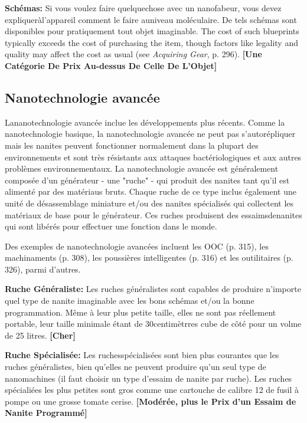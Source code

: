 \textbf{Schémas:} Si vous voulez faire quelquechose avec un nanofabeur, vous devez expliqueràl'appareil comment le faire auniveau moléculaire. De tels schémas sont disponibles pour pratiquement tout objet imaginable. The cost of such blueprints typically exceeds the cost of purchasing the item, though factors like legality and quality may affect the cost as usual (see \emph{Acquiring Gear}, p. 296). \textbf{[Une Catégorie De Prix Au-dessus De Celle De L'Objet]} 

\subsection{Nanotechnologie avancée} \label{sec:advanced-nanotech} 

Lananotechnologie avancée inclue les développements plus récents. Comme la nanotechnologie basique, la nanotechnologie avancée ne peut pas s'autorépliquer mais les nanites peuvent fonctionner normalement dans la plupart des environnements et sont très résistants aux attaques bactériologiques et aux autres problèmes environnementaux. La nanotechnologie avancée est généralement composée d'un générateur - une "ruche" - qui produit des nanites tant qu'il est alimenté par des matériaus bruts. Chaque ruche de ce type inclus également une unité de désassemblage miniature et/ou des nanites spécialisés qui collectent les matériaux de base pour le générateur. Ces ruches produisent des essaimsdenanites qui sont libérés pour effectuer une fonction dans le monde. 

Des exemples de nanotechnologie avancées incluent les OOC (p. 315), les machinaments (p. 308), les poussières intelligentes (p. 316) et les outilitaires (p. 326), parmi d'autres. 

\textbf{Ruche Généraliste:} Les ruches généralistes sont capables de produire n'importe quel type de nanite imaginable avec les bons schémas et/ou la bonne programmation. Même à leur plus petite taille, elles ne sont pas réellement portable, leur taille minimale étant de 30centimètrres cube de côté pour un volme de 25 litres. \textbf{[Cher]} 

\textbf{Ruche Spécialisée:} Les ruchesspécialisées sont bien plus courantes que les ruches généralistes, bien qu'elles ne peuvent produire qu'un seul type de nanomachines (il faut choisir un type d'essaim de nanite par ruche). Les ruches spécialiées les plus petites sont gros comme une cartouche de calibre 12 de fusil à pompe ou une grosse tomate cerise. \textbf{[Modérée, plus le Prix d'un Essaim de Nanite Programmé]} 

